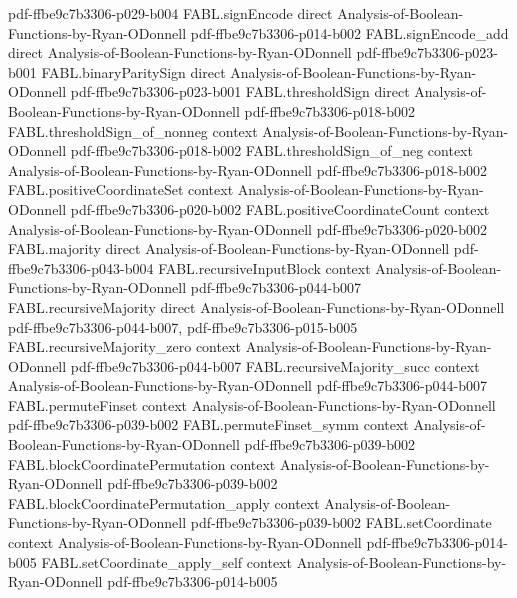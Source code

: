 \begin{theorem}
  {pdf-ffbe9c7b3306-p029-b004}
\proofstep
  {FABL.signEncode}
  {direct}
  {Analysis-of-Boolean-Functions-by-Ryan-ODonnell}
  {pdf-ffbe9c7b3306-p014-b002}
\proofstep
  {FABL.signEncode_add}
  {direct}
  {Analysis-of-Boolean-Functions-by-Ryan-ODonnell}
  {pdf-ffbe9c7b3306-p023-b001}
\proofstep
  {FABL.binaryParitySign}
  {direct}
  {Analysis-of-Boolean-Functions-by-Ryan-ODonnell}
  {pdf-ffbe9c7b3306-p023-b001}
\proofstep
  {FABL.thresholdSign}
  {direct}
  {Analysis-of-Boolean-Functions-by-Ryan-ODonnell}
  {pdf-ffbe9c7b3306-p018-b002}
\proofstep
  {FABL.thresholdSign_of_nonneg}
  {context}
  {Analysis-of-Boolean-Functions-by-Ryan-ODonnell}
  {pdf-ffbe9c7b3306-p018-b002}
\proofstep
  {FABL.thresholdSign_of_neg}
  {context}
  {Analysis-of-Boolean-Functions-by-Ryan-ODonnell}
  {pdf-ffbe9c7b3306-p018-b002}
\proofstep
  {FABL.positiveCoordinateSet}
  {context}
  {Analysis-of-Boolean-Functions-by-Ryan-ODonnell}
  {pdf-ffbe9c7b3306-p020-b002}
\proofstep
  {FABL.positiveCoordinateCount}
  {context}
  {Analysis-of-Boolean-Functions-by-Ryan-ODonnell}
  {pdf-ffbe9c7b3306-p020-b002}
\proofstep
  {FABL.majority}
  {direct}
  {Analysis-of-Boolean-Functions-by-Ryan-ODonnell}
  {pdf-ffbe9c7b3306-p043-b004}
\proofstep
  {FABL.recursiveInputBlock}
  {context}
  {Analysis-of-Boolean-Functions-by-Ryan-ODonnell}
  {pdf-ffbe9c7b3306-p044-b007}
\proofstep
  {FABL.recursiveMajority}
  {direct}
  {Analysis-of-Boolean-Functions-by-Ryan-ODonnell}
  {pdf-ffbe9c7b3306-p044-b007,
    pdf-ffbe9c7b3306-p015-b005}
\proofstep
  {FABL.recursiveMajority_zero}
  {context}
  {Analysis-of-Boolean-Functions-by-Ryan-ODonnell}
  {pdf-ffbe9c7b3306-p044-b007}
\proofstep
  {FABL.recursiveMajority_succ}
  {context}
  {Analysis-of-Boolean-Functions-by-Ryan-ODonnell}
  {pdf-ffbe9c7b3306-p044-b007}
\proofstep
  {FABL.permuteFinset}
  {context}
  {Analysis-of-Boolean-Functions-by-Ryan-ODonnell}
  {pdf-ffbe9c7b3306-p039-b002}
\proofstep
  {FABL.permuteFinset_symm}
  {context}
  {Analysis-of-Boolean-Functions-by-Ryan-ODonnell}
  {pdf-ffbe9c7b3306-p039-b002}
\proofstep
  {FABL.blockCoordinatePermutation}
  {context}
  {Analysis-of-Boolean-Functions-by-Ryan-ODonnell}
  {pdf-ffbe9c7b3306-p039-b002}
\proofstep
  {FABL.blockCoordinatePermutation_apply}
  {context}
  {Analysis-of-Boolean-Functions-by-Ryan-ODonnell}
  {pdf-ffbe9c7b3306-p039-b002}
\proofstep
  {FABL.setCoordinate}
  {context}
  {Analysis-of-Boolean-Functions-by-Ryan-ODonnell}
  {pdf-ffbe9c7b3306-p014-b005}
\proofstep
  {FABL.setCoordinate_apply_self}
  {context}
  {Analysis-of-Boolean-Functions-by-Ryan-ODonnell}
  {pdf-ffbe9c7b3306-p014-b005}
\proofstep

\end{theorem}
